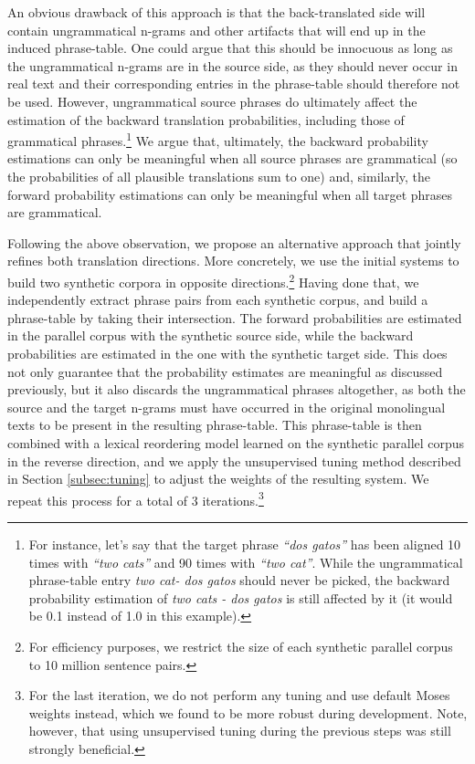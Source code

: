 \documentclass[11pt,a4paper]{article}
\begin{document}
An obvious drawback of this approach is that the back-translated side will contain ungrammatical n-grams and other artifacts that will end up in the induced phrase-table. One could argue that this should be innocuous as long as the ungrammatical n-grams are in the source side, as they should never occur in real text and their corresponding entries in the phrase-table should therefore not be used. However, ungrammatical source phrases do ultimately affect the estimation of the backward translation probabilities, including those of grammatical phrases.\footnote{For instance, let's say that the target phrase \textit{``dos gatos''} has been aligned 10 times with \textit{``two cats''} and 90 times with \textit{``two cat''}. While the ungrammatical phrase-table entry \textit{two cat- dos gatos} should never be picked, the backward probability estimation of \textit{two cats - dos gatos} is still affected by it (it would be 0.1 instead of 1.0 in this example).} We argue that, ultimately, the backward probability estimations can only be meaningful when all source phrases are grammatical (so the probabilities of all plausible translations sum to one) and, similarly, the forward probability estimations can only be meaningful when all target phrases are grammatical.

Following the above observation, we propose an alternative approach that jointly refines both translation directions. More concretely, we use the initial systems to build two synthetic corpora in opposite directions.\footnote{For efficiency purposes, we restrict the size of each synthetic parallel corpus to 10 million sentence pairs.} Having done that, we independently extract phrase pairs from each synthetic corpus, and build a phrase-table by taking their intersection. The forward probabilities are estimated in the parallel corpus with the synthetic source side, while the backward probabilities are estimated in the one with the synthetic target side. This does not only guarantee that the probability estimates are meaningful as discussed previously, but it also discards the ungrammatical phrases altogether, as both the source and the target n-grams must have occurred in the original monolingual texts to be present in the resulting phrase-table. This phrase-table is then combined with a lexical reordering model learned on the synthetic parallel corpus in the reverse direction, and we apply the unsupervised tuning method described in Section \ref{subsec:tuning} to adjust the weights of the resulting system. We repeat this process for a total of 3 iterations.\footnote{For the last iteration, we do not perform any tuning and use default Moses weights instead, which we found to be more robust during development. Note, however, that using unsupervised tuning during the previous steps was still strongly beneficial.}
\end{document}
